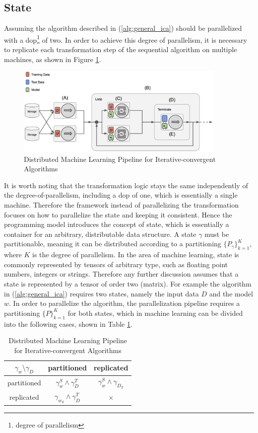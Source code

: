 \subsection{State}
Assuming the algorithm described in (\ref{alg:general_ica}) should be parallelized with a dop\footnote{degree of parallelism} of two.
In order to achieve this degree of parallelism, it is necessary to replicate each transformation step of the sequential algorithm on multiple machines, as shown in Figure \ref{fig:ica_control_flow_dist}.
\begin{figure}[ht]
\centering
\includegraphics[width=0.9\textwidth]{img/ica_control_flow_dist.png}
\caption{Distributed Machine Learning Pipeline for Iterative-convergent Algorithms}
\label{fig:ica_control_flow_dist}
\end{figure}
It is worth noting that the transformation logic stays the same independently of the degree-of-parallelism, including a dop of one, which is essentially a single machine.
Therefore the framework instead of parallelizing the transformation focuses on how to parallelize the state and keeping it consistent.
Hence the programming model introduces the concept of state, which is essentially a container for an arbitrary, distributable data structure.
A state $\gamma$ must be partitionable, meaning it can be distributed according to a partitioning $\{P_{\gamma}\}_{k=1}^K$, where $K$ is the degree of parallelism.
In the area of machine learning, state is commonly represented by tensors of arbitrary type, such as floating point numbers, integers or strings.
Therefore any further discussion assumes that a state is represented by a tensor of order two (matrix).
For example the algorithm in (\ref{alg:general_ica}) requires two states, namely the input data $D$ and the model $w$.
In order to parallelize the algorithm, the parallelization pipeline requires a partitioning $\{P\}_{k=1}^K$ for both states, which in machine learning can be divided into the following cases, shown in Table \ref{tab:ica_partitioning}.
\begin{table}[h]
\begin{center}
\begin{tabular}{ | c | c | c |}
\hline
$\gamma_w \setminus \gamma_D$ & partitioned & replicated \\ \hline
partitioned & $\gamma_w^S \wedge \gamma_D^T$ &  $\gamma_w^S \wedge \gamma_{D_T}$\\ \hline
replicated & $\gamma_{w_S} \wedge \gamma_D^T$ & $\times$\\
\hline
\end{tabular}
\label{tab:ica_partitioning}
\caption{Distributed Machine Learning Pipeline for Iterative-convergent Algorithms}
\end{center}
\end{table}
